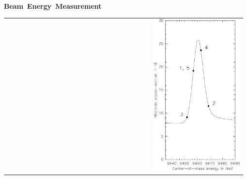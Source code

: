 \documentclass[landscape]{article}
\newenvironment{slide}[1][ ]{\mbox{\bf #1 } \vfill}{\vfill \mbox{ } \pagebreak}
\begin{document}
\begin{slide}[Beam Energy Measurement]
\begin{tabular}{p{0.6\linewidth} p{0.38\linewidth}}
\begin{minipage}{\linewidth}
  \end{minipage} &
  \begin{minipage}{\linewidth}
    \includegraphics[width=\linewidth]{../plenary_fitorder}
  \end{minipage}
\end{tabular}

\end{slide}
\end{document}
